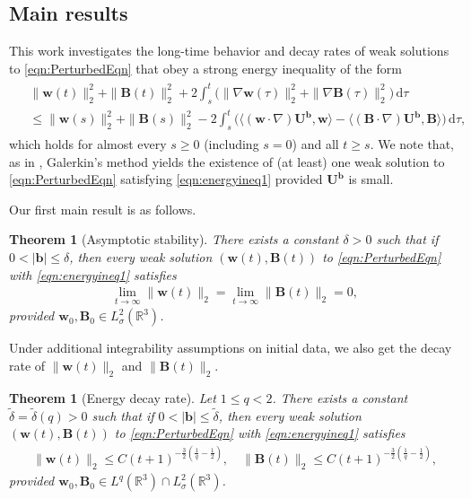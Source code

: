 \documentclass[10pt]{amsart}
\theoremstyle{plain}
\newtheorem{theorem}[lemma]{Theorem}
\theoremstyle{definition}
\theoremstyle{remark}
\numberwithin{equation}{section}
\newcommand{\R}{\mathbb{R}}
\newcommand{\bb}{{\boldsymbol{b}}}
\newcommand{\bU}{{\boldsymbol{U}}}
\newcommand{\bw}{{\boldsymbol{w}}}
\newcommand{\bB}{{\boldsymbol{B}}}
\begin{document}
\subsection{Main results}\label{ssec:main}
This work investigates the long-time behavior and decay rates of weak solutions to \cref{eqn:PerturbedEqn} that obey a strong energy inequality of the form
\begin{align}\label{eqn:energyineq1}
\begin{aligned}
&\|\bw(t)\|_2^2 + \|\bB(t)\|_2^2 + 2 \int_s^t \bigl( \| \nabla \bw(\tau)\|_2^2 + \| \nabla \bB(\tau)\|_2^2 \bigr) \,\mathrm d \tau\\
& \le \|\bw(s)\|_2^2 + \|\bB(s)\|_2^2 - 2 \int_s^t \bigl( \langle (\bw \cdot \nabla) \bU^\bb, \bw \rangle - \langle (\bB \cdot \nabla) \bU^\bb, \bB \rangle \bigr) \,\mathrm d \tau,
\end{aligned}
\end{align}
which holds for almost every $s \ge 0$ (including $s=0$) and all $t \ge s$. We note that, as in \cite[Theorem 2.1]{KarchPilarczyk2011}, Galerkin's method yields the existence of (at least) one weak solution to \cref{eqn:PerturbedEqn} satisfying \cref{eqn:energyineq1} provided $\bU^\bb$ is small.

Our first main result is as follows.
\begin{theorem}[Asymptotic stability]\label{thm:stability}
There exists a constant $\delta>0$ such that if $0<|\bb|\le \delta$, then every weak solution $(\bw(t),\bB(t))$ to \cref{eqn:PerturbedEqn} with \cref{eqn:energyineq1} satisfies
\begin{align*}
    \lim\limits_{t\to \infty} \|\bw(t)\|_2=\lim\limits_{t\to \infty} \|\bB(t)\|_2=0,
\end{align*}
provided $\bw_0, \bB_0 \in L^2_{\sigma}(\R^3)$.
\end{theorem}

Under additional integrability assumptions on initial data, we also get the decay rate of $\|\bw(t)\|_2$ and $\|\bB(t)\|_2$.

\begin{theorem}[Energy decay rate]\label{thm:decay}
    Let $1\le q<2$. There exists a constant $\tilde\delta=\tilde\delta(q)>0$ such that if $0<|\bb|\le \tilde\delta$, then every weak solution $(\bw(t),\bB(t))$ to \cref{eqn:PerturbedEqn} with \cref{eqn:energyineq1}  satisfies
\begin{align*}
    \|\bw(t)\|_2 \le C(t+1)^{-\frac{3}{2}(\frac{1}{q}-\frac{1}{2})},\quad 
    \|\bB(t)\|_2 \le C(t+1)^{-\frac{3}{2}(\frac{1}{q}-\frac{1}{2})},
\end{align*}
provided $\bw_0, \bB_0 \in L^q(\R^3)\cap L^2_{\sigma}(\R^3)$.
\end{theorem}
\end{document}

